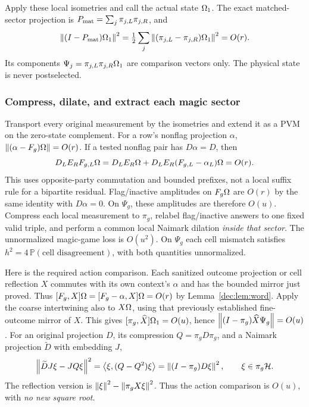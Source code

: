 Apply these local isometries and call the actual state $\Omega_1$. The exact matched-sector projection is $P_{\rm mat}=\sum_j\pi_{j,L}\pi_{j,R}$, and
\[
\left\lVert(I-P_{\rm mat})\Omega_1\right\rVert^2
=\tfrac12\sum_j\left\lVert(\pi_{j,L}-\pi_{j,R})\Omega_1\right\rVert^2=O(r).
\]
Its components $\Psi_j=\pi_{j,L}\pi_{j,R}\Omega_1$ are comparison vectors only. The physical state is never postselected.

\subsubsection{Compress, dilate, and extract each magic sector}
Transport every original measurement by the isometries and extend it as a PVM on the zero-state complement. For a row's nonflag projection $\alpha$, $\left\lVert(\alpha-F_g)\Omega\right\rVert=O(r)$. If a tested nonflag pair has $D\alpha=D$, then
\[
D_LE_RF_{g,L}\Omega=D_LE_R\Omega+D_LE_R(F_{g,L}-\alpha_L)\Omega=O(r).
\]
This uses opposite-party commutation and bounded prefixes, not a local suffix rule for a bipartite residual. Flag/inactive amplitudes on $F_g\Omega$ are $O(r)$ by the same identity with $D\alpha=0$. On $\Psi_g$, these amplitudes are therefore $O(u)$. Compress each local measurement to $\pi_g$, relabel flag/inactive answers to one fixed valid triple, and perform a common local Naimark dilation \emph{inside that sector}. The unnormalized magic-game loss is $O(u^2)$. On $\Psi_g$ each cell mismatch satisfies $h^2=4\,\mathbb P(\text{cell disagreement})$, with both quantities unnormalized.

Here is the required action comparison. Each sanitized outcome projection or cell reflection $X$ commutes with its own context's $\alpha$ and has the bounded mirror just proved. Thus
$[F_g,X]\Omega=[F_g-\alpha,X]\Omega=O(r)$ by Lemma~\ref{dec:lem:word}. Apply the coarse intertwining also to $X\Omega$, using that previously established fine-outcome mirror of $X$. This gives
$[\pi_g,\widehat X]\Omega_1=O(u)$, hence
$\left\lVert(I-\pi_g)\widehat X\Psi_g\right\rVert=O(u)$.
For an original projection $D$, its compression $Q=\pi_gD\pi_g$, and a Naimark projection $\widetilde D$ with embedding $J$,
\begin{equation}\label{dec:eq:naimarkerror}
\left\lVert\widetilde D J\xi-JQ\xi\right\rVert^2
=\left\langle\xi,(Q-Q^2)\xi\right\rangle
=\left\lVert(I-\pi_g)D\xi\right\rVert^2,\qquad \xi\in\pi_g\mathcal H.
\end{equation}
The reflection version is $\left\lVert\xi\right\rVert^2-\left\lVert\pi_gX\xi\right\rVert^2$. Thus the action comparison is $O(u)$, with \emph{no new square root}.

